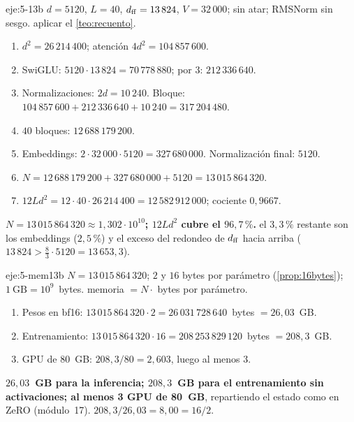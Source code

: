 \begin{solucion}{eje:5-13b}
\datos $d=5120$, $L=40$, $d_{\mathrm{ff}}=13\,824$, $V=32\,000$; sin atar; RMSNorm sin sesgo.
\planteamiento aplicar el \cref{teo:recuento}.
\pasos
\begin{enumerate}[label=\arabic*.]
  \item $d^{2}=26\,214\,400$; atención $4d^{2}=104\,857\,600$.
  \item SwiGLU: $5120\cdot 13\,824=70\,778\,880$; por $3$: $212\,336\,640$.
  \item Normalizaciones: $2d=10\,240$. Bloque: $104\,857\,600+212\,336\,640+10\,240=317\,204\,480$.
  \item $40$ bloques: $12\,688\,179\,200$.
  \item Embeddings: $2\cdot 32\,000\cdot 5120=327\,680\,000$. Normalización final: $5120$.
  \item $N=12\,688\,179\,200+327\,680\,000+5120=13\,015\,864\,320$.
  \item $12Ld^{2}=12\cdot 40\cdot 26\,214\,400=12\,582\,912\,000$; cociente $0{,}9667$.
\end{enumerate}
\resultado \textbf{$N=13\,015\,864\,320\approx 1{,}302\cdot 10^{10}$; $12Ld^{2}$ cubre el $96{,}7\,\%$.}
\comprobacion el $3{,}3\,\%$ restante son los embeddings ($2{,}5\,\%$) y el exceso del redondeo de $d_{\mathrm{ff}}$ hacia arriba ($13\,824>\frac83\cdot 5120=13\,653{,}3$).
\end{solucion}

\begin{solucion}{eje:5-mem13b}
\datos $N=13\,015\,864\,320$; $2$ y $16$ bytes por parámetro (\cref{prop:16bytes}); $1~\mathrm{GB}=10^{9}$~bytes.
\planteamiento memoria $=N\cdot$ bytes por parámetro.
\pasos
\begin{enumerate}[label=\arabic*.]
  \item Pesos en bf16: $13\,015\,864\,320\cdot 2=26\,031\,728\,640$~bytes $=26{,}03$~GB.
  \item Entrenamiento: $13\,015\,864\,320\cdot 16=208\,253\,829\,120$~bytes $=208{,}3$~GB.
  \item GPU de $80$~GB: $208{,}3/80=2{,}603$, luego al menos $3$.
\end{enumerate}
\resultado \textbf{$26{,}03$~GB para la inferencia; $208{,}3$~GB para el entrenamiento sin activaciones; al menos 3 GPU de 80~GB}, repartiendo el estado como en ZeRO (módulo~17).
\comprobacion $208{,}3/26{,}03=8{,}00=16/2$.
\end{solucion}

